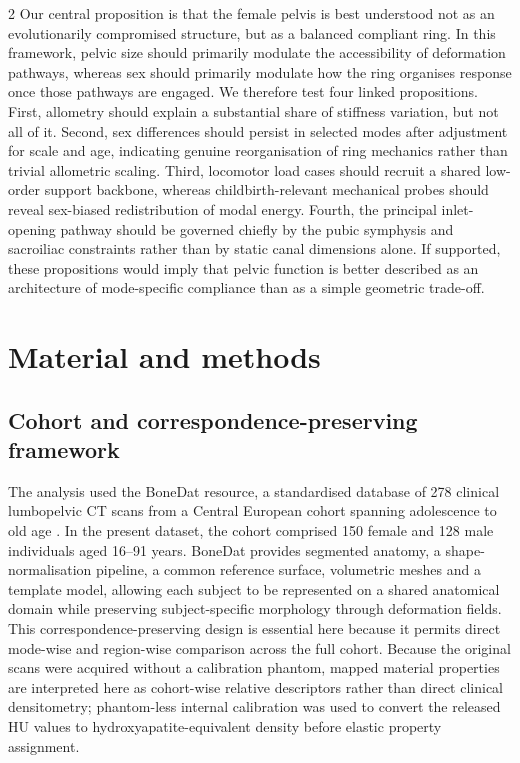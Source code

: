 \documentclass[openacc]{rsproca_new}
\begin{document}
\begin{multicols}{2}
Our central proposition is that the female pelvis is best understood not as an evolutionarily compromised structure, but as a balanced compliant ring. In this framework, pelvic size should primarily modulate the accessibility of deformation pathways, whereas sex should primarily modulate how the ring organises response once those pathways are engaged. We therefore test four linked propositions. First, allometry should explain a substantial share of stiffness variation, but not all of it. Second, sex differences should persist in selected modes after adjustment for scale and age, indicating genuine reorganisation of ring mechanics rather than trivial allometric scaling. Third, locomotor load cases should recruit a shared low-order support backbone, whereas childbirth-relevant mechanical probes should reveal sex-biased redistribution of modal energy. Fourth, the principal inlet-opening pathway should be governed chiefly by the pubic symphysis and sacroiliac constraints rather than by static canal dimensions alone. If supported, these propositions would imply that pelvic function is better described as an architecture of mode-specific compliance than as a simple geometric trade-off.

\section{Material and methods}

\subsection{Cohort and correspondence-preserving framework}

The analysis used the BoneDat resource, a standardised database of 278 clinical lumbopelvic CT scans from a Central European cohort spanning adolescence to old age \cite{HenysKuchar2025}. In the present dataset, the cohort comprised 150 female and 128 male individuals aged 16--91 years. BoneDat provides segmented anatomy, a shape-normalisation pipeline, a common reference surface, volumetric meshes and a template model, allowing each subject to be represented on a shared anatomical domain while preserving subject-specific morphology through deformation fields. This correspondence-preserving design is essential here because it permits direct mode-wise and region-wise comparison across the full cohort. Because the original scans were acquired without a calibration phantom, mapped material properties are interpreted here as cohort-wise relative descriptors rather than direct clinical densitometry; phantom-less internal calibration was used to convert the released HU values to hydroxyapatite-equivalent density before elastic property assignment.


\end{multicols}
\end{document}
